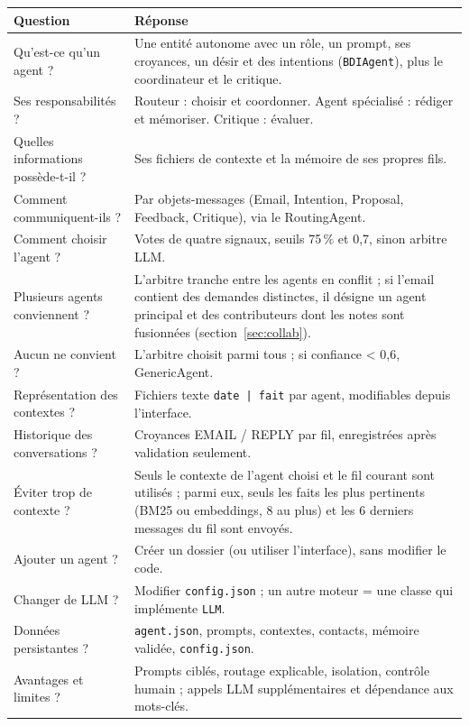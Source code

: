 \documentclass[11pt,a4paper]{article}
\newcommand{\code}[1]{\texttt{#1}}
\begin{document}
\begin{table}[H]
\centering
\small
\begin{tabularx}{\linewidth}{>{\raggedright\arraybackslash}p{4.3cm} L}
\toprule
\textbf{Question} & \textbf{Réponse} \\
\midrule
Qu'est-ce qu'un agent ? & Une entité autonome avec un rôle, un prompt, ses croyances, un désir et des intentions (\code{BDIAgent}), plus le coordinateur et le critique. \\
Ses responsabilités ? & Routeur : choisir et coordonner. Agent spécialisé : rédiger et mémoriser. Critique : évaluer. \\
Quelles informations possède-t-il ? & Ses fichiers de contexte et la mémoire de ses propres fils. \\
Comment communiquent-ils ? & Par objets-messages (Email, Intention, Proposal, Feedback, Critique), via le RoutingAgent. \\
Comment choisir l'agent ? & Votes de quatre signaux, seuils 75\,\% et 0,7, sinon arbitre LLM. \\
Plusieurs agents conviennent ? & L'arbitre tranche entre les agents en conflit ; si l'email contient des demandes distinctes, il désigne un agent principal et des contributeurs dont les notes sont fusionnées (section~\ref{sec:collab}). \\
Aucun ne convient ? & L'arbitre choisit parmi tous ; si confiance < 0,6, GenericAgent. \\
Représentation des contextes ? & Fichiers texte \code{date | fait} par agent, modifiables depuis l'interface. \\
Historique des conversations ? & Croyances EMAIL / REPLY par fil, enregistrées après validation seulement. \\
Éviter trop de contexte ? & Seuls le contexte de l'agent choisi et le fil courant sont utilisés ; parmi eux, seuls les faits les plus pertinents (BM25 ou embeddings, 8 au plus) et les 6 derniers messages du fil sont envoyés. \\
Ajouter un agent ? & Créer un dossier (ou utiliser l'interface), sans modifier le code. \\
Changer de LLM ? & Modifier \code{config.json} ; un autre moteur = une classe qui implémente \code{LLM}. \\
Données persistantes ? & \code{agent.json}, prompts, contextes, contacts, mémoire validée, \code{config.json}. \\
Avantages et limites ? & Prompts ciblés, routage explicable, isolation, contrôle humain ; appels LLM supplémentaires et dépendance aux mots-clés. \\
\bottomrule
\end{tabularx}
\end{table}
\end{document}
